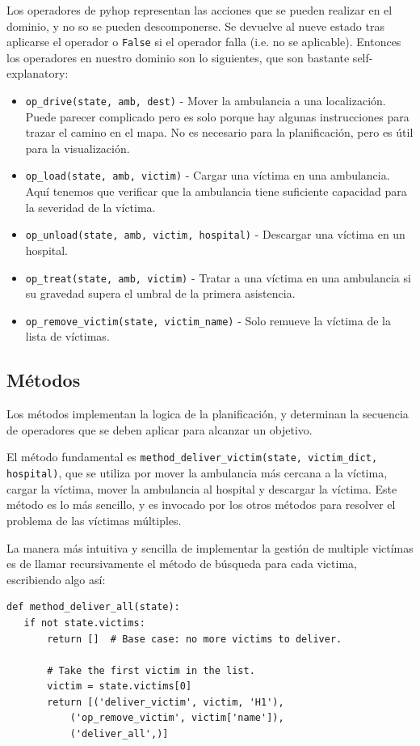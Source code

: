 Los operadores de pyhop representan las acciones que se pueden realizar en el dominio, y no so se pueden descomponerse. Se devuelve al nueve estado tras aplicarse el operador o \lstinline|False| si el operador falla (i.e. no se aplicable).
Entonces los operadores en nuestro dominio son lo siguientes, que son bastante self-explanatory:
\begin{itemize}
   \item \lstinline|op_drive(state, amb, dest)| - Mover la ambulancia a una localización. Puede parecer complicado pero es solo porque hay algunas instrucciones para trazar el camino en el mapa. No es necesario para la planificación, pero es útil para la visualización. 
   \item \lstinline|op_load(state, amb, victim)| - Cargar una víctima en una ambulancia. Aquí tenemos que verificar que la ambulancia tiene suficiente capacidad para la severidad de la víctima.
   \item \lstinline|op_unload(state, amb, victim, hospital)| - Descargar una víctima en un hospital.
   \item \lstinline|op_treat(state, amb, victim)| - Tratar a una víctima en una ambulancia si su gravedad supera el umbral de la primera asistencia.
   \item \lstinline|op_remove_victim(state, victim_name)| - Solo remueve la víctima de la lista de víctimas.
\end{itemize}

\subsection{Métodos}

Los métodos implementan la logica de la planificación, y determinan la secuencia de operadores que se deben aplicar para alcanzar un objetivo.

El método fundamental es \lstinline|method_deliver_victim(state, victim_dict, hospital)|, que se utiliza por mover la ambulancia más cercana a la víctima, cargar la víctima, mover la ambulancia al hospital y descargar la víctima.
Este método es lo más sencillo, y es invocado por los otros métodos para resolver el problema de las víctimas múltiples.


La manera más intuitiva y sencilla de implementar la gestión de multiple victímas es de llamar recursivamente el método de búsqueda para cada victima, escribiendo algo así:
\begin{lstlisting}[caption={Esto no se encuentra en el código entregado}, captionpos=b]
   def method_deliver_all(state):
   if not state.victims:
       return []  # Base case: no more victims to deliver.
   
       # Take the first victim in the list.
       victim = state.victims[0]
       return [('deliver_victim', victim, 'H1'),
           ('op_remove_victim', victim['name']),
           ('deliver_all',)]
\end{lstlisting}

